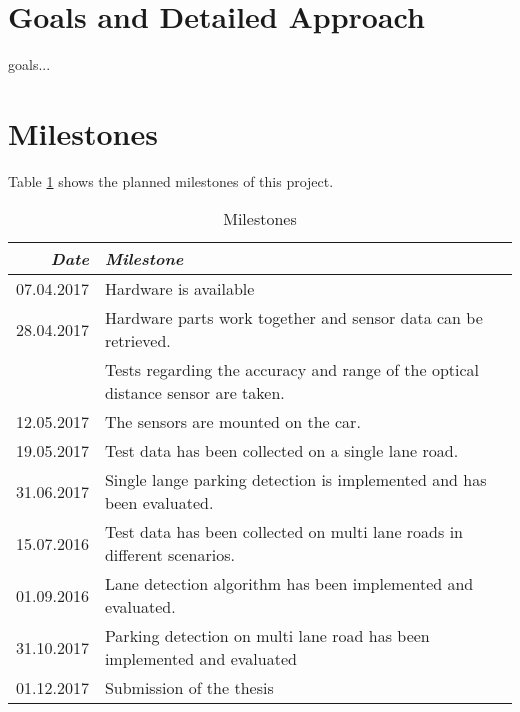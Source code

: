 \documentclass[11pt,a4paper,titlepage,
chapterprefix,headsepline,parskip,pdftex,
,pointlessnumbers,bibtotoc]{article}
\begin{document}


\section{Goals and Detailed Approach}
goals...

\section{Milestones}

Table \ref{tab:milestones} shows the planned milestones of this project.

\begin{table}[h]
\centering
\begin{tabular}{r|l}
\emph{Date} & \emph{Milestone} \\\hline
07.04.2017 & Hardware is available \\
28.04.2017 & Hardware parts work together and sensor data can be retrieved. \\
 & Tests regarding the accuracy and range of the optical distance sensor are taken. \\
12.05.2017 & The sensors are mounted on the car. \\
19.05.2017 & Test data has been collected on a single lane road. \\
31.06.2017 & Single lange parking detection is implemented and has been evaluated. \\
15.07.2016 & Test data has been collected on multi lane roads in different scenarios. \\
01.09.2016 & Lane detection algorithm has been implemented and evaluated. \\
31.10.2017 & Parking detection on multi lane road has been implemented and evaluated \\
01.12.2017 & Submission of the thesis
\end{tabular}
\caption{\label{tab:milestones} Milestones}
\end{table}


%

% 



%
\end{document}
